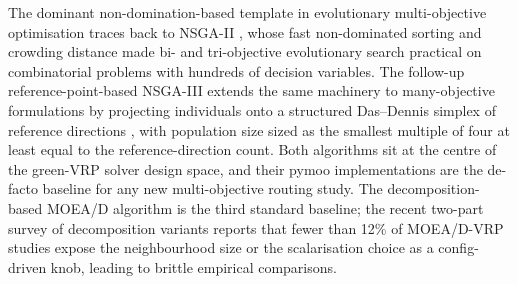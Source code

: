 \documentclass[review,preprint,authoryear,12pt]{elsarticle}
\begin{document}
The dominant non-domination-based template in evolutionary
multi-objective optimisation traces back to NSGA-II
\citep{deb2002nsga2}, whose fast non-dominated sorting and crowding
distance made bi- and tri-objective evolutionary search practical on
combinatorial problems with hundreds of decision variables. The
follow-up reference-point-based NSGA-III \citep{debjain2014nsga3}
extends the same machinery to many-objective formulations by
projecting individuals onto a structured Das--Dennis simplex of
reference directions \citep{dasdennis1998nbi}, with population size
sized as the smallest multiple of four at least equal to the
reference-direction count. Both algorithms sit at the centre of the
green-VRP solver design space, and their pymoo implementations
\citep{blank2020pymoo} are the de-facto baseline for any new
multi-objective routing study. The decomposition-based MOEA/D
algorithm \citep{zhang2007moead} is the third standard baseline; the
recent two-part survey of decomposition variants
\citep{li2024moead_survey} reports that fewer than 12\% of MOEA/D-VRP
studies expose the neighbourhood size or the scalarisation choice as
a config-driven knob, leading to brittle empirical comparisons.
\end{document}
